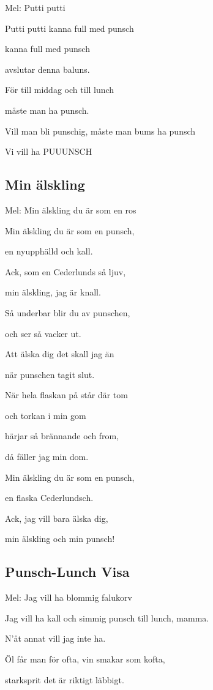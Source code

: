 Mel: Putti putti\bigskip


Putti putti kanna full med punsch

kanna full med punsch

avslutar denna baluns.

För till middag och till lunch

måste man ha punsch.

Vill man bli punschig, måste man bums ha punsch

Vi vill ha PUUUNSCH

\subsection{\textbf{Min älskling}}

Mel: Min älskling du är som en ros\bigskip

Min älskling du är som en punsch,

en nyupphälld och kall.

Ack, som en Cederlunds så ljuv,

min älskling, jag är knall.\bigskip

Så underbar blir du av punschen,

och ser så vacker ut.

Att älska dig det skall jag än

när punschen tagit slut.\bigskip

När hela flaskan på står där tom

och torkan i min gom

härjar så brännande och from,

då fäller jag min dom.\bigskip

Min älskling du är som en punsch,

en flaska Cederlundsch.

Ack, jag vill bara älska dig,

min älskling och min punsch!\bigskip

\subsection{\textbf{Punsch-Lunch Visa}}

Mel: Jag vill ha blommig falukorv\bigskip


Jag vill ha kall och simmig punsch till lunch, mamma.

N'åt annat vill jag inte ha.

Öl får man för ofta, vin smakar som kofta,

starksprit det är riktigt läbbigt.

